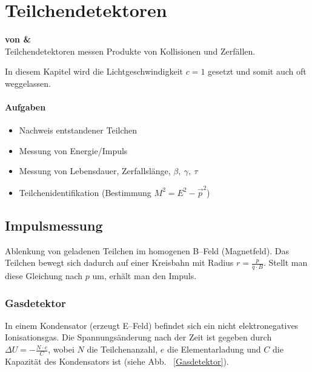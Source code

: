 \documentclass[Ex4_Zusammenfassung.tex]{subfiles}
\begin{document}
\chapter{Teilchendetektoren}
\textbf{von \hein \& \martina} \\

Teilchendetektoren messen Produkte von Kollisionen und Zerfällen.

In diesem Kapitel wird die Lichtgeschwindigkeit $c=1$ gesetzt und somit auch oft weggelassen.
\subsubsection*{Aufgaben}
\begin{itemize}
	\item Nachweis entstandener Teilchen
	\item Messung von Energie/Impuls
	\item Messung von Lebensdauer, Zerfallslänge, $\beta,\ \gamma,\ \tau$
	\item Teilchenidentifikation (Bestimmung $M^2 = E^2 - \vec{p}^2$)
\end{itemize}

\section{Impulsmessung}
Ablenkung von geladenen Teilchen im homogenen B--Feld (Magnetfeld). Das Teilchen bewegt sich dadurch auf einer Kreisbahn mit Radius $r=\frac{p}{q\cdot B}$. Stellt man diese Gleichung nach $p	$ um, erhält man den Impuls. 

\subsection{Gasdetektor}
In einem Kondensator (erzeugt E--Feld) befindet sich ein nicht elektronegatives Ionisationsgas.
Die Spannungsänderung nach der Zeit ist gegeben durch \linebreak $\Delta U = -\frac{N\cdot e }{C}$, wobei $N$ die Teilchenanzahl, $e$ die Elementarladung und $C$ die Kapazität des Kondensators ist (siehe Abb. ~\ref{Gasdetektor}).
\end{document}
